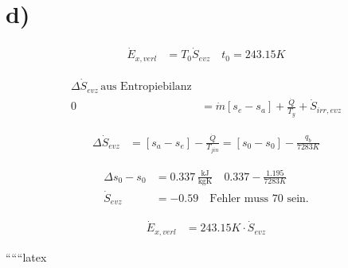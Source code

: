 

\section*{d)}

\begin{align*}
\dot{E}_{x, verl} &= T_0 \dot{S}_{evz} \quad t_0 = 243.15K
\end{align*}

\begin{align*}
\Delta \dot{S}_{evz} \, \text{aus Entropiebilanz} \\
0 &= \dot{m} [s_e - s_a] + \frac{\dot{Q}}{T_y} + \dot{S}_{irr, evz}
\end{align*}

\begin{align*}
\Delta \dot{S}_{evz} &= [s_a - s_e] - \frac{\dot{Q}}{T_{jin}} = [s_0 - s_0] - \frac{q_b}{7283K}
\end{align*}

\begin{align*}
\Delta s_0 - s_0 &= 0.337 \, \frac{\text{kJ}}{\text{kgK}} \quad 0.337 - \frac{1.195}{7283K} \\
\dot{S}_{evz} &= -0.59 \quad \text{Fehler muss 70 sein.}
\end{align*}

\begin{align*}
\dot{E}_{x, verl} &= 243.15K \cdot \dot{S}_{evz}
\end{align*}

``````latex